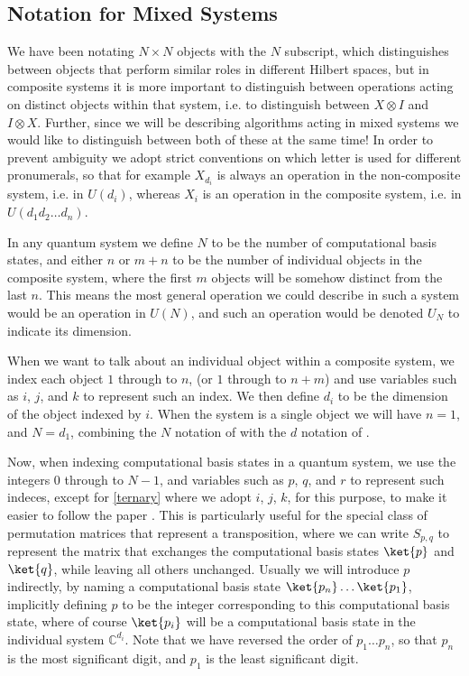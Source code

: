 \subsection{Notation for Mixed Systems}\label{notation}
We have been notating $N \times N$ objects with the $N$ subscript, which distinguishes between objects that perform similar roles in different Hilbert spaces, but in composite systems it is more important to distinguish between operations acting on distinct objects within that system, i.e. to distinguish between $X \otimes I$ and $I \otimes X$. Further, since we will be describing algorithms acting in mixed systems we would like to distinguish between both of these at the same time! In order to prevent ambiguity we adopt strict conventions on which letter is used for different pronumerals, so that for example $X_{d_i}$ is always an operation in the non-composite system, i.e. in $U(d_i)$, whereas $X_i$ is an operation in the composite system, i.e. in $U(d_1d_2\dots d_n)$.

In any quantum system we define $N$ to be the number of computational basis states, and either $n$ or $m+n$ to be the number of individual objects in the composite system, where the first $m$ objects will be somehow distinct from the last $n$. This means the most general operation we could describe in such a system would be an operation in $U(N)$, and such an operation would be denoted $U_N$ to indicate its dimension.

When we want to talk about an individual object within a composite system, we index each object $1$ through to $n$, (or $1$ through to $n+m$) and use variables such as $i$, $j$, and $k$ to represent such an index. We then define $d_i$ to be the dimension of the object indexed by $i$. When the system is a single object we will have $n = 1$, and $N = d_1$, combining the $N$ notation of \cite{tolar-clifford} with the $d$ notation of \cite{multi-valued-logic}.

Now, when indexing computational basis states in a quantum system, we use the integers $0$ through to $N-1$, and variables such as $p$, $q$, and $r$ to represent such indeces, except for \autoref{ternary} where we adopt $i$, $j$, $k$, for this purpose, to make it easier to follow the paper \cite{arithmetics}. This is particularly useful for the special class of permutation matrices that represent a transposition, where we can write $S_{p,q}$ to represent the matrix that exchanges the computational basis states $\ket{p}$ and $\ket{q}$, while leaving all others unchanged. Usually we will introduce $p$ indirectly, by naming a computational basis state $\ket{p_n}\dots\ket{p_1}$, implicitly defining $p$ to be the integer corresponding to this computational basis state, where of course $\ket{p_i}$ will be a computational basis state in the individual system $\mathbb{C}^{d_i}$. Note that we have reversed the order of $p_1 \dots p_n$, so that $p_n$ is the most significant digit, and $p_1$ is the least significant digit.

